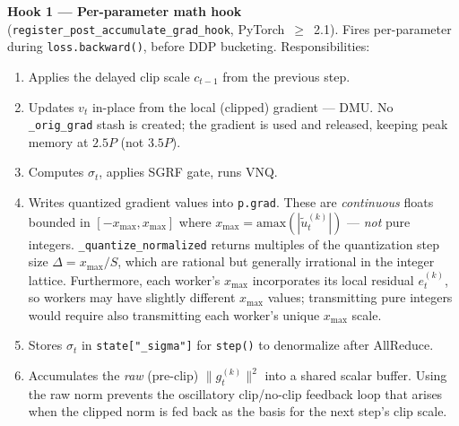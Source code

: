 \documentclass[10pt,twocolumn]{article}
\begin{document}
\textbf{Hook 1 — Per-parameter math hook}
(\texttt{register\_post\_accumulate\_grad\_hook}, PyTorch~$\geq$~2.1).
Fires per-parameter during \texttt{loss.backward()}, before DDP bucketing.
Responsibilities:
\begin{enumerate}[label=(\arabic*)]
  \item Applies the delayed clip scale $c_{t-1}$ from the previous step.
  \item Updates $v_t$ in-place from the local (clipped) gradient — DMU.
    No \texttt{\_orig\_grad} stash is created; the gradient is used and released,
    keeping peak memory at $2.5P$ (not $3.5P$).
  \item Computes $\sigma_t$, applies SGRF gate, runs VNQ.
  \item Writes quantized gradient values into \texttt{p.grad}.
    These are \emph{continuous} floats bounded in $[-x_{\max}, x_{\max}]$
    where $x_{\max} = \mathrm{amax}(|\tilde{u}_t^{(k)}|)$ — \emph{not} pure
    integers.  \texttt{\_quantize\_normalized} returns multiples of the
    quantization step size $\Delta = x_{\max} / S$, which are rational but
    generally irrational in the integer lattice.  Furthermore, each worker's
    $x_{\max}$ incorporates its local residual $e_t^{(k)}$, so workers may
    have slightly different $x_{\max}$ values; transmitting pure integers
    would require also transmitting each worker's unique $x_{\max}$ scale.
  \item Stores $\sigma_t$ in \texttt{state["\_sigma"]} for \texttt{step()} to
    denormalize after AllReduce.
  \item Accumulates the \emph{raw} (pre-clip) $\|g_t^{(k)}\|^2$ into a
    shared scalar buffer.  Using the raw norm prevents the oscillatory
    clip/no-clip feedback loop that arises when the clipped norm is fed back
    as the basis for the next step's clip scale.
\end{enumerate}
\end{document}
